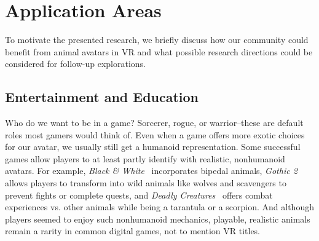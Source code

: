 %
%

\section{Application Areas}
\label{section:application}

To motivate the presented research, we briefly discuss how our community could benefit from animal avatars in VR and what possible research directions could be considered for follow-up explorations.

\subsection{Entertainment and Education}

Who do we want to be in a game? Sorcerer, rogue, or warrior--these are default roles most gamers would think of. Even when a game offers more exotic choices for our avatar, we usually still get a humanoid representation. Some successful games allow players to at least partly identify with realistic, nonhumanoid avatars. For example, \textit{Black \& White}~\cite{BlackWhite} incorporates bipedal animals, \textit{Gothic 2}~\cite{Gothic} allows players to transform into wild animals like wolves and scavengers to prevent fights or complete quests, and \textit{Deadly Creatures}~\cite{Deadly} offers combat experiences vs. other animals while being a tarantula or a scorpion. And although players seemed to enjoy such nonhumanoid mechanics, playable, realistic animals remain a rarity in common digital games, not to mention VR titles.

